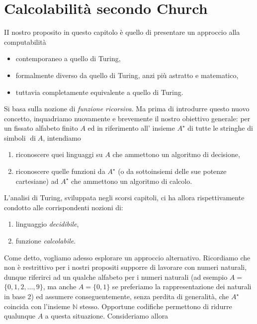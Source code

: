 \section{Calcolabilità secondo Church}

II nostro proposito in questo capitolo è quello di presentare un approccio alla
computabilità

\begin{itemize}
    \item contemporaneo a quello di Turing,
    \item formalmente diverso da
          quello di Turing, anzi più astratto e matematico,
    \item tuttavia completamente equivalente a quello di Turing.
\end{itemize}


Si basa sulla nozione di \textit{funzione ricorsiva}. Ma
prima di introdurre questo nuovo concetto, inquadriamo nuovamente e brevemente
il nostro obiettivo generale: per un fissato alfabeto finito $A$ ed in
riferimento all' insieme $A^{\star}$ di tutte le stringhe di simboli
$\operatorname{di} A$, intendiamo

\begin{enumerate}
    \item riconoscere quei linguaggi su $A$ che
          ammettono un algoritmo di decisione,
    \item riconoscere quelle funzioni da
          $A^{\star}$ (o da sottoinsiemi delle sue potenze cartesiane) ad $A^{\star}$ che
          ammettono un algoritmo di calcolo.
\end{enumerate}


L'analisi di Turing, sviluppata negli scorsi capitoli, ci ha allora
rispettivamente condotto alle corrispondenti nozioni di:

\begin{enumerate}
    \item linguaggio \textit{decidibile},
    \item funzione \textit{calcolabile}.
\end{enumerate}


Come detto, vogliamo adesso esplorare un
approccio alternativo. Ricordiamo che non è restrittivo per i nostri propositi
supporre di lavorare con numeri naturali, dunque riferirci ad un qualche
alfabeto per i numeri naturali (ad esempio $A=$ $\{0,1,2, \ldots, 9\}$, ma anche
$A=\{0,1\}$ se preferiamo la rappresentazione dei naturali in base 2) ed
assumere conseguentemente, senza perdita di generalità, che $A^{\star}$ coincida
con l'insieme $\mathbb{N}$ stesso. Opportune codifiche permettono di ridurre
qualunque $A$ a questa situazione. Consideriamo allora

